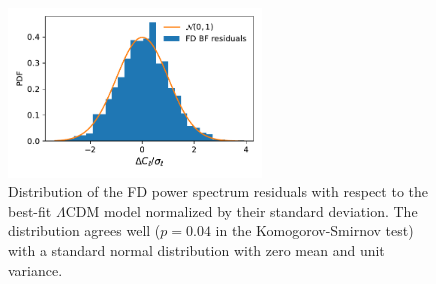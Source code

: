 \documentclass[a4paper,11pt]{article}
\newcommand{\lcdm}{$\Lambda$CDM\xspace}
\newcommand{\alld}{FD\xspace}
\begin{document}
      \begin{figure}
        \centering
        \includegraphics[width=0.6\textwidth]{figures/FD_res_histogram.pdf}
        \caption{Distribution of the \alld power spectrum residuals with respect to the best-fit \lcdm model normalized by their standard deviation. The distribution agrees well ($p = 0.04$ in the Komogorov-Smirnov test) with a standard normal distribution with zero mean and unit variance.}\label{fig:res_normal}
      \end{figure}
\end{document}
